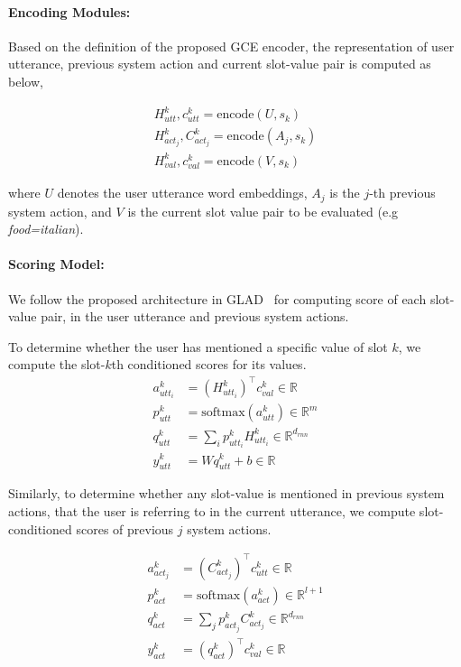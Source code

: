 \documentclass{article}
\begin{document}
\paragraph{Encoding Modules:} Based on the definition of the proposed GCE encoder, the representation of user utterance, previous system action and current slot-value pair is computed as below, 

\begin{align}
    H^{k}_{utt}, c^{k}_{utt} = \text{encode}(U,s_{k}) \\
    H^{k}_{act_{j}}, C^{k}_{act_{j}} = \text{encode}(A_{j}, s_{k}) \\
    H^{k}_{val}, c^{k}_{val} = \text{encode}(V, s_{k})
\end{align}

where $U$ denotes the user utterance word embeddings, $A_{j}$ is the $j$-th previous system action, and $V$ is the current slot value pair to be evaluated (e.g \textit{food=italian}).


\paragraph{Scoring Model:} We follow the proposed architecture in GLAD~\citep{Zhong2018GlobalLocallySD} for computing score of each slot-value pair, in the user utterance and previous system actions.

To determine whether the user has mentioned a specific value of slot $k$, we compute the slot-$k$th conditioned scores for its values.
\begin{align}
    a^{k}_{utt_{i}} & = (H^{k}_{utt_{i}})^\intercal c_{val}^{k} \in \mathbb{R} \\
    p_{utt}^{k} & = \text{softmax}(a_{utt}^{k}) \in \mathbb{R}^{m} \\
    q_{utt}^{k} & = \sum_{i}{p^{k}_{utt_{i}} H^{k}_{utt_{i}}} \in \mathbb{R}^{d_{rnn}} \\
    y^{k}_{utt} & = W q^{k}_{utt} + b \in \mathbb{R}
\end{align}

Similarly, to determine whether any slot-value is mentioned in previous system actions, that the user is referring to in the current utterance, we compute slot-conditioned scores of previous $j$ system actions. 

\begin{align}
    a^{k}_{act_{j}} & = (C^{k}_{act_{j}})^\intercal c^{k}_{utt} \in \mathbb{R} \\
    p^{k}_{act} &= \text{softmax}(a^{k}_{act}) \in \mathbb{R}^{l+1} \\
    q^{k}_{act} &= \sum_{j}{p^{k}_{act_{j}} C^{k}_{act_{j}}} \in \mathbb{R}^{d_{rnn}} \\
    y^{k}_{act} &= (q^{k}_{act})^\intercal c^{k}_{val} \in \mathbb{R}
\end{align}
\end{document}
